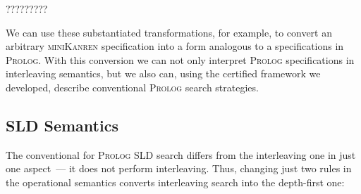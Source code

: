 \begin{comment}
The overall result is not literally the same as what we've shown in Section~\ref{language}, but denotationally equivalent.

The conversion in the opposite direction involves the following steps:

\begin{itemize}
  \item converting between term representation;
  \item moving all ``\lstinline|fresh|'' constructs into the top-level;
  \item transforming the freshless body into DNF;
  \item replacing all unifications with calls for a specific predicate ``\lstinline|unify/2|'', defined as

\begin{lstlisting}
   unify (X, X).
\end{lstlisting}    

  \item splitting the top-level disjunctions into separate clauses with the same head.
\end{itemize}

The correctness of these, again, can be justified denotationally. For the append$^o$ relation in Section~\ref{language} the result
will be as follows:

\begin{lstlisting}
  append (X, Y, Z) :- unify (X, []), unify (Z, Y).
  append (X, Y, Z) :-
    unify (X, [H$|$T]),
    unify (Z, [H$|$TY]),
    append (T, Y, TY).
\end{lstlisting}

\end{comment}

{\color{red} ?????????

We can use these substantiated transformations, for example, to convert an arbitrary \textsc{miniKanren} specification into a form analogous to a specifications in \textsc{Prolog}.
With this conversion we can not only interpret \textsc{Prolog} specifications in interleaving semantics, but we also can, using the certified framework we developed, describe conventional \textsc{Prolog} search strategies.
}

\subsection{SLD Semantics}
\label{sld}

The conventional for \textsc{Prolog} SLD search differs from the interleaving one in just one aspect~--- it does not perform interleaving.
Thus, changing just two rules in the operational semantics converts interleaving search into the depth-first one:

